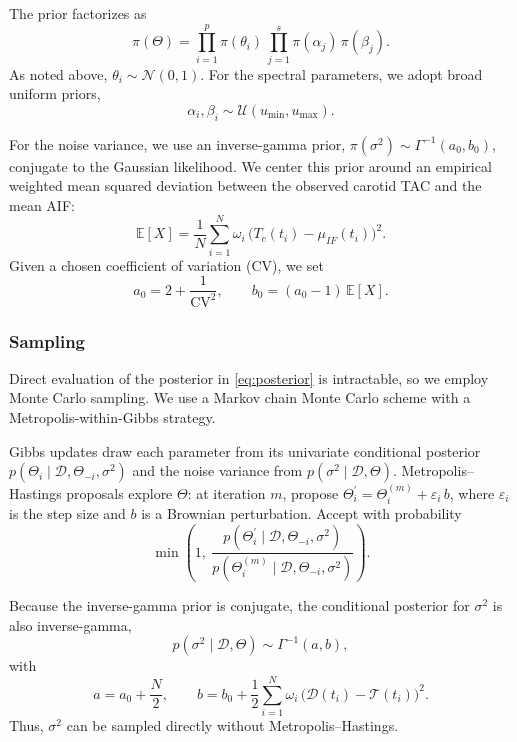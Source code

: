 The prior factorizes as
\begin{equation}
	\pi(\Theta) = \prod_{i=1}^p \pi(\theta_i)\,\prod_{j=1}^s \pi(\alpha_j)\,\pi(\beta_j).
\end{equation}
As noted above, \(\theta_i \sim \mathcal{N}(0,1)\).
For the spectral parameters, we adopt broad uniform priors,
\begin{equation}
	\alpha_i,\beta_i \sim \mathcal{U}( u_{\text{min}} , u_{\text{max}} ).
\end{equation}

For the noise variance, we use an inverse-gamma prior, \(\pi(\sigma^2) \sim \Gamma^{-1}(a_0,b_0)\), conjugate to the Gaussian likelihood.
We center this prior around an empirical weighted mean squared deviation between the observed carotid TAC and the mean AIF:
\begin{equation}
	\mathbb{E}[X] = \frac{1}{N} \sum_{i=1}^{N} \omega_i\,\bigl(T_c(t_i) - \mu_{IF}(t_i)\bigr)^2.
\end{equation}
Given a chosen coefficient of variation (CV), we set
\begin{equation}
	a_0 = 2 + \frac{1}{\mathrm{CV}^2}, \qquad b_0 = (a_0 - 1)\,\mathbb{E}[X].
\end{equation}

\subsubsection{Sampling}
Direct evaluation of the posterior in \eqref{eq:posterior} is intractable, so we employ Monte Carlo sampling.
We use a Markov chain Monte Carlo scheme with a Metropolis-within-Gibbs strategy.

Gibbs updates draw each parameter from its univariate conditional posterior \(p(\Theta_i \mid \mathcal{D}, \Theta_{-i}, \sigma^2)\) and the noise variance from \(p(\sigma^2 \mid \mathcal{D},\Theta)\).
Metropolis–Hastings proposals explore \(\Theta\): at iteration \(m\), propose \(\Theta_{i}^\prime = \Theta_{i}^{(m)} + \varepsilon_{i}\,b\), where \(\varepsilon_i\) is the step size and \(b\) is a Brownian perturbation.
Accept with probability
\begin{equation}
	\min\!\left(1,\ \frac{p(\Theta_i^\prime \mid \mathcal{D}, \Theta_{-i}, \sigma^2)}{p(\Theta_i^{(m)} \mid \mathcal{D}, \Theta_{-i}, \sigma^2)}\right).
\end{equation}

Because the inverse-gamma prior is conjugate, the conditional posterior for \(\sigma^2\) is also inverse-gamma,
\begin{equation}
	p(\sigma^2 \mid \mathcal{D},\Theta) \sim \Gamma^{-1}(a, b),
\end{equation}
with
\begin{equation}
	a = a_0 + \frac{N}{2}, \qquad b = b_0 + \frac{1}{2}\sum_{i=1}^{N} \omega_i\,\bigl(\mathcal{D}(t_i) - \mathcal{T}(t_i)\bigr)^2.
\end{equation}
Thus, \(\sigma^2\) can be sampled directly without Metropolis–Hastings.

